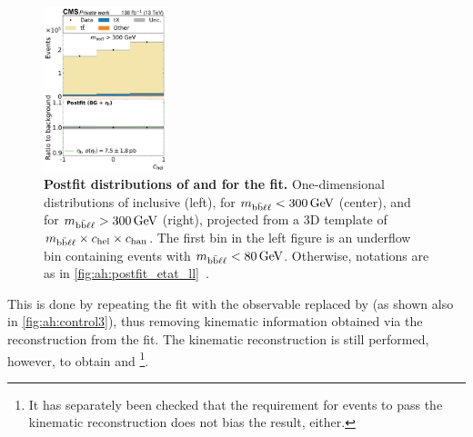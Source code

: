 \begin{figure}[p]
    \hfill
    \includegraphics[width=0.32\textwidth]{figures/ah/prepost/EtaT_mbbllspin_fit_s_ll_run2_both_chel_mbbllgt300.pdf}
    \caption{
        \label{fig:ah:postfit_mbbll}
        \textbf{Postfit distributions of \mbbll and \chel for the \etat fit.} One-dimensional distributions of inclusive \mbbll (left), \chel for $\mbbll < \SI{300}{\GeV}$ (center), and \chel for $\mbbll > \SI{300}{\GeV}$ (right), projected from a 3D template of $m_{\mathrm{b\bar{b}\ell\ell}} \times c_{\mathrm{hel}} \times c_{\mathrm{han}}$. The first \mbbll bin in the left figure is an underflow bin containing events with $\mbbll < \SI{80}{\GeV}$. Otherwise, notations are as in \cref{fig:ah:postfit_etat_ll}~\cite{CMS:TOP-24-007}.
    }  
\end{figure}


This is done by repeating the fit with the observable \mtt replaced by \mbbll (as shown also in \cref{fig:ah:control3}), thus removing kinematic information obtained via the reconstruction from the fit. The kinematic reconstruction is still performed, however, to obtain \chel and \chan\footnote{It has separately been checked that the requirement for events to pass the kinematic reconstruction does not bias the result, either.}. %

